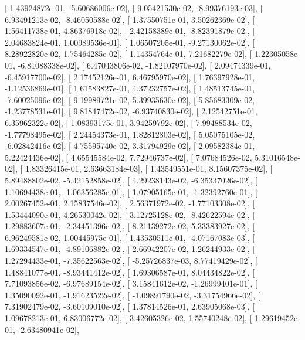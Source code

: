 \documentclass{article}
\begin{document}
       [  1.43924872e-01,  -5.60686006e-02],
       [  9.05421530e-02,  -8.99376193e-03],
       [  6.93491213e-02,  -8.46050588e-02],
       [  1.37550751e-01,   3.50262369e-02],
       [  1.56411738e-01,   4.86376918e-02],
       [  2.42158389e-01,  -8.82391879e-02],
       [  2.04683824e-01,   1.00989536e-01],
       [  1.06507205e-01,  -9.27130062e-02],
       [  8.28922820e-02,   1.75464285e-02],
       [  1.14354764e-01,   7.21682279e-02],
       [  1.22305058e-01,  -6.81088338e-02],
       [  6.47043806e-02,  -1.82107970e-02],
       [  2.09474339e-01,  -6.45917700e-02],
       [  2.17452126e-01,   6.46795970e-02],
       [  1.76397928e-01,  -1.12536869e-01],
       [  1.61583827e-01,   4.37232757e-02],
       [  1.48513745e-01,  -7.60025096e-02],
       [  9.19989721e-02,   5.39935630e-02],
       [  5.85683309e-02,  -1.23778531e-01],
       [  9.81847472e-02,  -6.93740830e-02],
       [  2.12542751e-01,   6.35962322e-02],
       [  1.08393175e-01,   3.94259792e-02],
       [  7.99488534e-02,  -1.77798495e-02],
       [  2.24454373e-01,   1.82812803e-02],
       [  5.05075105e-02,  -6.02842416e-02],
       [  4.75595740e-02,   3.31794929e-02],
       [  2.09582384e-01,   5.22424436e-02],
       [  4.65545584e-02,   7.72946737e-02],
       [  7.07684526e-02,   5.31016548e-02],
       [  1.83326415e-01,   2.63663184e-03],
       [  1.43549551e-01,   8.15607375e-02],
       [  5.89488802e-02,  -5.42152858e-02],
       [  4.29238143e-02,  -6.35337026e-02],
       [  1.10694438e-01,  -1.06356285e-01],
       [  1.07905165e-01,  -1.32392760e-01],
       [  2.00267452e-01,   2.15837546e-02],
       [  2.56371972e-02,  -1.77103308e-02],
       [  1.53444090e-01,   4.26530042e-02],
       [  3.12725128e-02,  -8.42622594e-02],
       [  1.29883607e-01,  -2.34451396e-02],
       [  8.21139272e-02,   5.33383927e-02],
       [  6.96249581e-02,   1.00445975e-01],
       [  1.43530511e-01,  -4.07167083e-03],
       [  1.69334547e-01,  -4.89106882e-02],
       [  2.66942207e-02,   1.26244933e-02],
       [  1.27294433e-01,  -7.35622563e-02],
       [ -5.25726837e-03,   8.77419429e-02],
       [  1.48841077e-01,  -8.93441412e-02],
       [  1.69306587e-01,   8.04434822e-02],
       [  7.71093856e-02,  -6.97689154e-02],
       [  3.15841612e-02,  -1.26999401e-01],
       [  1.35090092e-01,  -1.91623522e-02],
       [ -1.09891790e-02,  -3.31754966e-02],
       [  7.31902479e-02,  -3.60109010e-02],
       [  1.37814526e-01,   2.63905068e-03],
       [  1.09678213e-01,   6.83006772e-02],
       [  3.42605326e-02,   1.55740248e-02],
       [  1.29619452e-01,  -2.63480941e-02],
\end{document}
